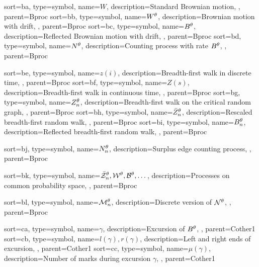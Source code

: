 {
	sort={ba},
	type=symbol,
	name={$W$},
	description={Standard Brownian motion, \pageref{I: bm}},
	parent=Bproc
}
{
	sort={bb},
	type=symbol,
	name={$W^{\theta}$},
	description={Brownian motion with drift, \pageref{D: Wt}},
	parent=Bproc
}
{
	sort={bc},
	type=symbol,
	name={$B^{\theta}$},
	description={Reflected Brownian motion with drift, \pageref{D: Bt}},
	parent=Bproc
}
{
	sort={bd},
	type=symbol,
name={$N^{\theta}$},
description={Counting process with rate $B^{\theta}$, \pageref{I: nt}},
parent=Bproc
}

{
	sort={be},
	type=symbol,
	name={$z(i)$},
	description={Breadth-first walk in discrete time, \pageref{E: def bf-walk z}},
	parent=Bproc
}
{
	sort={bf},
	type=symbol,
	name={$Z(s)$},
	description={Breadth-first walk in continuous time, \pageref{E: def Z}},
	parent=Bproc
}
{
	sort={bg},
	type=symbol,
	name={$Z_n^{\theta}$},
	description={Breadth-first walk on the critical random graph, \pageref{D: znt}},
	parent=Bproc
}
{
	sort={bh},
	type=symbol,
	name={$\bar{Z}^{\theta}_n$},
	description={Rescaled breadth-first random walk, \pageref{T: Z -> W}},
	parent=Bproc
}
{
	sort={bi},
	type=symbol,
	name={$B_n^{\theta}$},
	description={Reflected breadth-first random walk, \pageref{D: zminz}},
	parent=Bproc
}

{
	sort={bj},
	type=symbol,
name={$N_n^{\theta}$},
description={Surplus edge counting process, \pageref{I: nnt}},
parent=Bproc
}

{
	sort={bk},
	type=symbol,
name={$\bar{\mathcal{Z}}^{\theta}_n, \mathcal{W}^{\theta}, \mathcal{B}^{\theta}, \dots$},
description={Processes on common probability space, \pageref{I: alt processes}},
parent=Bproc
}

{
	sort={bl},
	type=symbol,
name={$\mathcal{M}_n^{\theta}$},
description={Discrete version of $\mathcal{N}^{\theta}$, \pageref{D: Ndis}},
parent=Bproc
}






{
	sort={ca},
	type=symbol,
	name={$\gamma$},
	description={Excursion of $B^{\theta}$, \pageref{I: gamma}},
	parent=Cother1
}
{
	sort={cb},
	type=symbol,
name={$l(\gamma), r(\gamma)$},
description={Left and right ends of excursion, \pageref{I: rgammalgamma}},
parent=Cother1
}
{
	sort={cc},
	type=symbol,
name={$\mu(\gamma)$},
description={Number of marks during excursion $\gamma$, \pageref{I: mugamma}},
parent=Cother1
}


